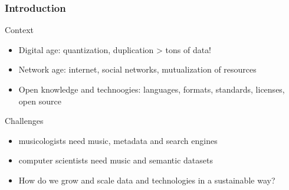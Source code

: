 \documentclass[final, hyperref, table]{beamer}
\begin{document}
\begin{frame}\frametitle{Introduction}
 \begin{block}{Context}
   \begin{itemize}
    \item \alert{Digital age}: quantization, duplication > tons of data!
    \item \alert{Network age}: internet, social networks, mutualization of resources
    \item \alert{Open knowledge and technoogies}: languages, formats, standards, licenses, open source
   \end{itemize}
\end{block}

\begin{block}{Challenges}
   \begin{itemize}
    \item \alert{musicologists} need music, metadata and search engines
    \item \alert{computer scientists} need music and semantic datasets
    \item How do we \alert{grow and scale} data and technologies in a \alert{sustainable way}?
   \end{itemize}
\end{block}



\end{frame}
\end{document}
